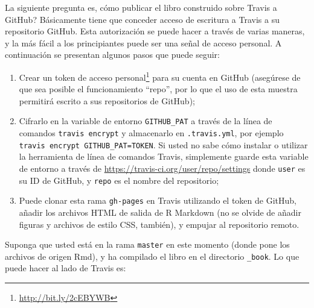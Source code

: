 \documentclass[12pt,]{krantz}
\makeatletter
\newenvironment{Shaded}{\begin{snugshade}}{\end{snugshade}}
\newcommand{\KeywordTok}[1]{\textcolor[rgb]{0.13,0.29,0.53}{\textbf{{#1}}}}
\newcommand{\StringTok}[1]{\textcolor[rgb]{0.31,0.60,0.02}{{#1}}}
\newcommand{\CommentTok}[1]{\textcolor[rgb]{0.56,0.35,0.01}{\textit{{#1}}}}
\newcommand{\OtherTok}[1]{\textcolor[rgb]{0.56,0.35,0.01}{{#1}}}
\newcommand{\NormalTok}[1]{{#1}}
\providecommand{\tightlist}{%
  \setlength{\itemsep}{0pt}\setlength{\parskip}{0pt}}
\renewcommand{\href}[2]{#2\footnote{\url{#1}}}
\newenvironment{kframe}{%
\medskip{}
\setlength{\fboxsep}{.8em}
 \def\at@end@of@kframe{}%
 \ifinner\ifhmode%
  \def\at@end@of@kframe{\end{minipage}}%
  \begin{minipage}{\columnwidth}%
 \fi\fi%
 \def\FrameCommand##1{\hskip\@totalleftmargin \hskip-\fboxsep
 \colorbox{shadecolor}{##1}\hskip-\fboxsep
     \hskip-\linewidth \hskip-\@totalleftmargin \hskip\columnwidth}%
 \MakeFramed {\advance\hsize-\width
   \@totalleftmargin\z@ \linewidth\hsize
   \@setminipage}}%
 {\par\unskip\endMakeFramed%
 \at@end@of@kframe}
\renewenvironment{Shaded}{\begin{kframe}}{\end{kframe}}
\theoremstyle{definition}
\theoremstyle{definition}
\theoremstyle{remark}
\makeatother
\begin{document}
La siguiente pregunta es, cómo publicar el libro construido sobre Travis
a GitHub? Básicamente tiene que conceder acceso de escritura a Travis a
su repositorio GitHub. Esta autorización se puede hacer a través de
varias maneras, y la más fácil a los principiantes puede ser una señal
de acceso personal. A continuación se presentan algunos pasos que puede
seguir:

\begin{enumerate}
\def\labelenumi{\arabic{enumi}.}
\tightlist
\item
  Crear un \href{http://bit.ly/2cEBYWB}{token de acceso personal} para
  su cuenta en GitHub (asegúrese de que sea posible el funcionamiento
  ``repo'', por lo que el uso de esta muestra permitirá escrito a sus
  repositorios de GitHub);
\item
  Cifrarlo en la variable de entorno \texttt{GITHUB\_PAT} a través de la
  línea de comandos \texttt{travis\ encrypt} y almacenarlo en
  \texttt{.travis.yml}, por ejemplo
  \texttt{travis\ encrypt\ GITHUB\_PAT=TOKEN}. Si usted no sabe cómo
  instalar o utilizar la herramienta de línea de comandos Travis,
  simplemente guarde esta variable de entorno a través de
  \url{https://travis-ci.org/user/repo/settings} donde \texttt{user} es
  su ID de GitHub, y \texttt{repo} es el nombre del repositorio;
\item
  Puede clonar esta rama \texttt{gh-pages} en Travis utilizando el token
  de GitHub, añadir los archivos HTML de salida de R Markdown (no se
  olvide de añadir figuras y archivos de estilo CSS, también), y empujar
  al repositorio remoto.
\end{enumerate}

Suponga que usted está en la rama \texttt{master} en este momento (donde
pone los archivos de origen Rmd), y ha compilado el libro en el
directorio \texttt{\_book}. Lo que puede hacer al lado de Travis es:

\begin{Shaded}
\end{Shaded}
\end{document}
